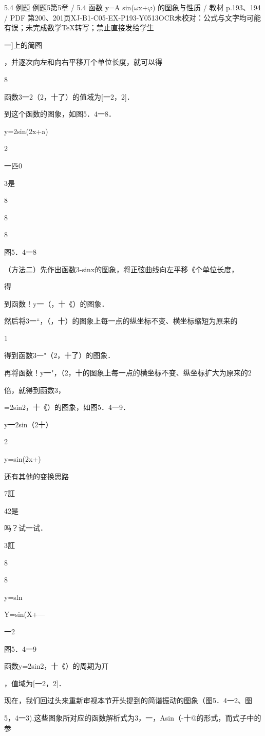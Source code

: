 \begin{bankitem}{5.4 例题 例题5}{第5章 / 5.4 函数 y=A sin(\ensuremath{\omega}x+\ensuremath{\varphi}) 的图象与性质 / 教材 p.193、194 / PDF 第200、201页}{XJ-B1-C05-EX-P193-Y0513}{OCR未校对：公式与文字均可能有误；未完成数学TeX转写；禁止直接发给学生}
\begin{ocrdraft}
一]上的简图
\par
，并逐次向左和向右平移丌个单位长度，就可以得
\par
8
\par
函数3一2（2，十了）的值域为[一2，2]．
\par
到这个函数的图象，如图5．4一8．
\par
y=2sin(2x+a)
\par
2
\par
一匹0
\par
3是
\par
8
\par
8
\par
8
\par
图5．4一8
\par
（方法二）先作出函数3-sinx的图象，将正弦曲线向左平移《个单位长度，
\par
得
\par
到函数！y一（，十《）的图象．
\par
[教材p.194 / PDF第201页]
\par
然后将3一“，（，十）的图象上每一点的纵坐标不变、横坐标缩短为原来的
\par
1
\par
得到函数3一"（2，十了）的图象．
\par
再将函数！y一"，（2，十的图象上每一点的横坐标不变、纵坐标扩大为原来的2
\par
倍，就得到函数3，
\par
=2sin2，十《）的图象，如图5．4一9．
\par
y一2sin（2十）
\par
2
\par
y=sin(2x+)
\par
还有其他的变换思路
\par
7訌
\par
42是
\par
吗？试一试．
\par
3訌
\par
8
\par
8
\par
y=sln
\par
Y=sin(X+—
\par
一2
\par
图5．4一9
\par
函数y=2sin2，十《）的周期为丌
\par
，值域为[一2，2]．
\par
现在，我们回过头来重新审视本节开头提到的简谐振动的图象（图5．4一2、图
\par
5，4一3).这些图象所对应的函数解析式为3，一，Asin（-十@的形式，而式子中的参

\end{ocrdraft}
\end{bankitem}
